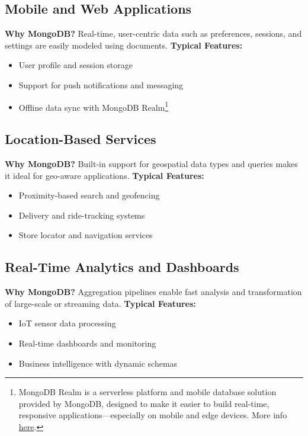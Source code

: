\documentclass{article}
\begin{document}
\subsection*{Mobile and Web Applications}
\textbf{Why MongoDB?} Real-time, user-centric data such as preferences, sessions, and settings are easily modeled using documents.
\textbf{Typical Features:}
\begin{itemize}
    \item User profile and session storage
    \item Support for push notifications and messaging
    \item Offline data sync with MongoDB Realm\footnote{MongoDB Realm is a serverless platform and mobile database solution provided by MongoDB, designed to make it easier to build real-time, responsive applications—especially on mobile and edge devices.  More info \href{https://www.mongodb.com/resources/products/platform/webinar-get-started-with-mongodb-realm}{here}.}
\end{itemize}

\subsection*{Location-Based Services}
\textbf{Why MongoDB?} Built-in support for geospatial data types and queries makes it ideal for geo-aware applications.
\textbf{Typical Features:}
\begin{itemize}
    \item Proximity-based search and geofencing
    \item Delivery and ride-tracking systems
    \item Store locator and navigation services
\end{itemize}

\subsection*{Real-Time Analytics and Dashboards}
\textbf{Why MongoDB?} Aggregation pipelines enable fast analysis and transformation of large-scale or streaming data.
\textbf{Typical Features:}
\begin{itemize}
    \item IoT sensor data processing
    \item Real-time dashboards and monitoring
    \item Business intelligence with dynamic schemas
\end{itemize}
\end{document}
